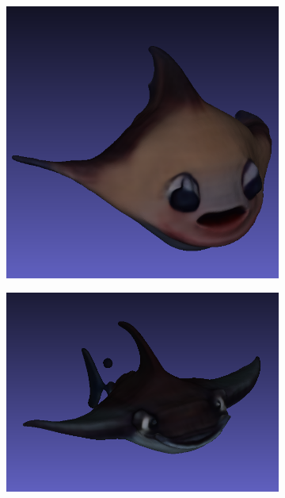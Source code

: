 \begin{figure}[H]
\begin{subfigure}[b]{0.1825\textwidth}
        \includegraphics[width=\textwidth]{etc/Genie/manta_coarse_3.png}
        \caption{}
    \end{subfigure}
    \begin{subfigure}[b]{0.25\textwidth}
        \centering
        \includegraphics[width=\textwidth]{etc/Genie/manta_coarse_4.png}
        \caption{}
    \end{subfigure}


\end{figure}

